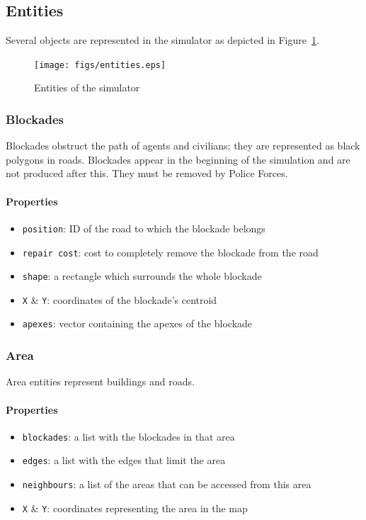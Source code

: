 \documentclass{article}
\begin{document}
\subsection{Entities}
Several objects are represented in the simulator as depicted in Figure~\ref{fig:entities}.
\begin{figure}[ht]
  \centering
  \texttt{[image: figs/entities.eps]}
  \caption{Entities of the simulator}
  \label{fig:entities}
\end{figure}
\subsubsection{Blockades}
Blockades obstruct the path of agents and civilians; they are represented as black polygons in roads. Blockades appear in the beginning of the simulation and are not produced after this. They must be removed by Police Forces.

\paragraph{Properties}
\begin{itemize}
  \item \texttt{position}: ID of the road to which the blockade belongs
  \item \texttt{repair cost}: cost to completely remove the blockade from the road
  \item \texttt{shape}: a rectangle which surrounds the whole blockade
  \item \texttt{X} \& \texttt{Y}: coordinates of the blockade's centroid
  \item \texttt{apexes}: vector containing the apexes of the blockade
\end{itemize}
\subsubsection{Area}
Area entities represent buildings and roads.

\paragraph{Properties}
\begin{itemize}
  \item \texttt{blockades}: a list with the blockades in that area
  \item \texttt{edges}: a list with the edges that limit the area
  \item \texttt{neighbours}: a list of the areas that can be accessed from this area
  \item \texttt{X} \& \texttt{Y}: coordinates representing the area in the map
\end{itemize}
\end{document}
